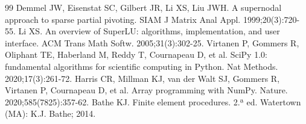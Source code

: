 \documentclass[11pt,a4paper]{article}
\begin{document}
\begin{thebibliography}{99}
 Demmel JW, Eisenstat SC, Gilbert JR, Li XS, Liu JWH. A supernodal approach to sparse partial pivoting. SIAM J Matrix Anal Appl. 1999;20(3):720-55.
 Li XS. An overview of SuperLU: algorithms, implementation, and user interface. ACM Trans Math Softw. 2005;31(3):302-25.
 Virtanen P, Gommers R, Oliphant TE, Haberland M, Reddy T, Cournapeau D, et al. SciPy 1.0: fundamental algorithms for scientific computing in Python. Nat Methods. 2020;17(3):261-72.
 Harris CR, Millman KJ, van der Walt SJ, Gommers R, Virtanen P, Cournapeau D, et al. Array programming with NumPy. Nature. 2020;585(7825):357-62.
 Bathe KJ. Finite element procedures. 2.ª ed. Watertown (MA): K.J. Bathe; 2014.
\end{thebibliography}
\end{document}
